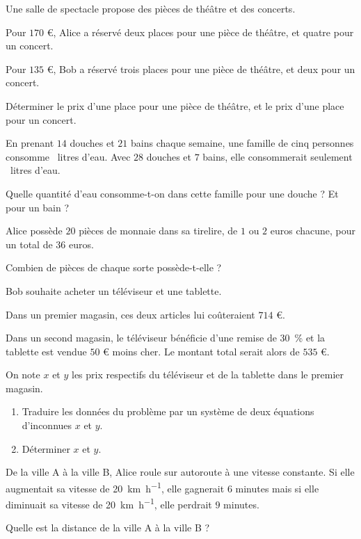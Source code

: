 \exo

Une salle de spectacle propose des pièces de théâtre et des concerts.

Pour $170$ \euro{}, Alice a réservé deux places pour une pièce de théâtre, et quatre pour un concert.

Pour $135$ \euro{}, Bob a réservé trois places pour une pièce de théâtre, et deux pour un concert.

Déterminer le prix d'une place pour une pièce de théâtre, et le prix d'une place pour un concert.

\exo

En prenant $14$ douches et $21$ bains chaque semaine, une famille de cinq personnes consomme ~litres d'eau. Avec $28$ douches et $7$ bains, elle consommerait seulement ~litres d'eau.

Quelle quantité d'eau consomme-t-on dans cette famille pour une douche ? Et pour un bain ?

\exo

Alice possède $20$ pièces de monnaie dans sa tirelire, de $1$ ou $2$ euros chacune, pour un total de $36$ euros.

Combien de pièces de chaque sorte possède-t-elle ?

\exo

Bob souhaite acheter un téléviseur et une tablette.

Dans un premier magasin, ces deux articles lui coûteraient $714$ \euro{}.

Dans un second magasin, le téléviseur bénéficie d'une remise de \SI[retain-explicit-plus]{30}{\percent} et la tablette est vendue $50$ \euro{} moins cher. Le montant total serait alors de $535$ \euro{}.

On note $x$ et $y$ les prix respectifs du téléviseur et de la tablette dans le premier magasin.
\begin{enumerate}
\item Traduire les données du problème par un système de deux équations d'inconnues $x$ et $y$.
\item Déterminer $x$ et $y$.
\end{enumerate}

\exo

De la ville A à la ville B, Alice roule sur autoroute à une vitesse constante. Si elle augmentait sa vitesse de \SI[per-mode=symbol]{20}{\km\per\hour}, elle gagnerait $6$ minutes mais si elle diminuait sa vitesse de \SI[per-mode=symbol]{20}{\km\per\hour}, elle perdrait $9$ minutes.

Quelle est la distance de la ville A à la ville B ?

